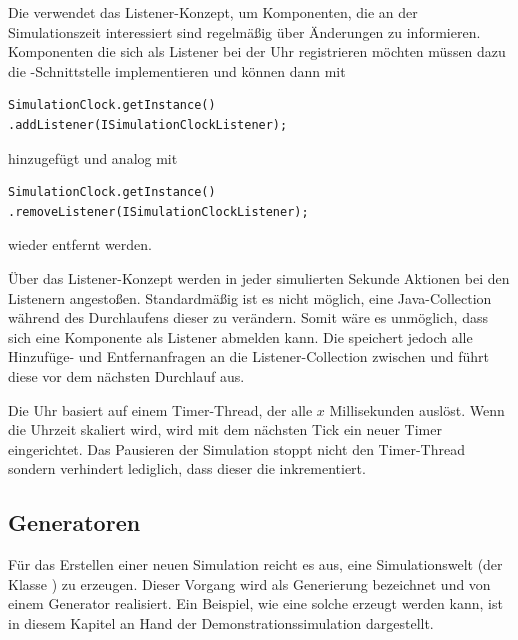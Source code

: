 Die  verwendet das Listener-Konzept, um Komponenten, die an der Simulationszeit interessiert sind regelmäßig über Änderungen zu informieren. Komponenten die sich als Listener bei der Uhr registrieren möchten müssen dazu die -Schnittstelle implementieren und können dann mit 
\begin{illfloat}[H]
  \begin{lstlisting}
SimulationClock.getInstance()
.addListener(ISimulationClockListener);
  \end{lstlisting}
\end{illfloat}

hinzugefügt und analog mit
\begin{illfloat}[H]
\begin{lstlisting}
SimulationClock.getInstance()
.removeListener(ISimulationClockListener);
\end{lstlisting}
\end{illfloat}
wieder entfernt werden.

Über das Listener-Konzept werden in jeder simulierten Sekunde Aktionen bei den Listenern angestoßen. Standardmäßig ist es nicht möglich, eine Java-Collection während des Durchlaufens dieser zu verändern. Somit wäre es unmöglich, dass sich eine Komponente als Listener abmelden kann. Die  speichert jedoch alle Hinzufüge- und Entfernanfragen an die Listener-Collection zwischen und führt diese vor dem nächsten Durchlauf aus.

Die Uhr basiert auf einem Timer-Thread, der alle $x$ Millisekunden auslöst. Wenn die Uhrzeit skaliert wird, wird mit dem nächsten Tick ein neuer Timer eingerichtet. Das Pausieren der Simulation stoppt nicht den Timer-Thread sondern verhindert lediglich, dass dieser die  inkrementiert.


\subsection{Generatoren}\label{subsec:real_generator}
Für das Erstellen einer neuen Simulation reicht es aus, eine Simulationswelt (der Klasse ) zu erzeugen. Dieser Vorgang wird als Generierung bezeichnet und von einem Generator realisiert.
Ein Beispiel, wie eine solche erzeugt werden kann, ist in diesem Kapitel an Hand der Demonstrationssimulation dargestellt.\\ 

